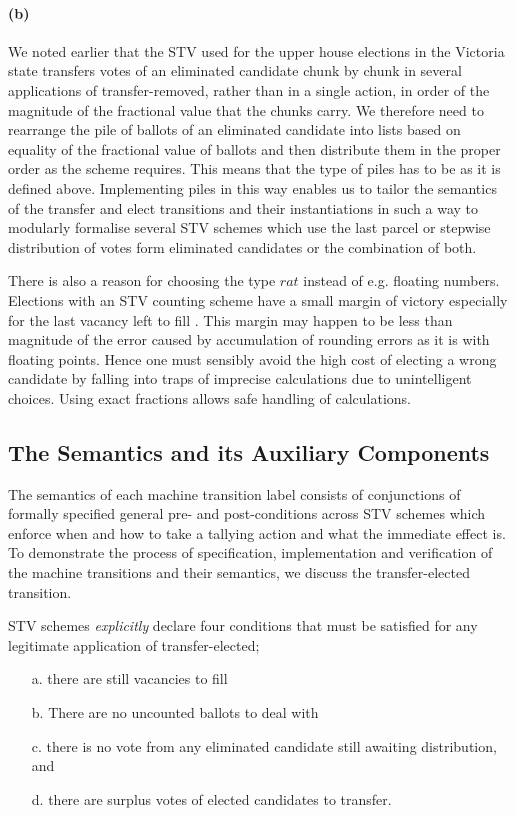 \documentclass[10pt,conference]{IEEEtran}
\begin{document}
\paragraph*{(b)} We noted earlier that the STV used for the upper house elections in the Victoria state transfers votes of an eliminated candidate chunk by chunk in several applications of transfer-removed, rather than in a single action, in order of the magnitude of the fractional value that the chunks carry. We therefore need to rearrange the pile of ballots of an eliminated candidate into lists based on equality of the fractional value of ballots and then distribute them in the proper order as the scheme requires. This means that the type of piles has to be as it is defined above.   
Implementing piles in this way enables us to tailor the semantics of the transfer and elect transitions and their instantiations in such a way to modularly formalise several STV schemes which use the last parcel or stepwise distribution of votes form eliminated candidates or the combination of both. 


There is also a reason for choosing the type $rat$  
instead of e.g. floating numbers. Elections with an STV counting scheme have a small margin of victory especially for the last vacancy left to fill \cite{MBlo}. This margin may happen to be less than magnitude of the error caused by accumulation of rounding errors as it is with floating points.  Hence one must sensibly avoid the high  cost of electing a wrong candidate by falling into traps of imprecise calculations due to unintelligent choices. Using exact fractions allows safe handling of calculations. 
\subsection{The Semantics and its Auxiliary Components}
\label{sec:MachineSem}

The semantics of each machine transition label consists of conjunctions of formally specified general pre- and post-conditions across STV schemes which enforce when and how to take a tallying action and what the immediate effect is. To demonstrate the process of specification, implementation and verification of the machine transitions and their semantics, we discuss the transfer-elected transition.


STV schemes \emph{explicitly} declare four conditions that must be satisfied  for any legitimate application of transfer-elected; 
\begin{itemize}
\item[a.] there are still vacancies to fill
\item[b.] There are no uncounted ballots to deal with
\item[c.] there is no vote from any eliminated candidate still awaiting distribution, and
\item[d.] there are surplus votes of elected candidates to  transfer.
\end{itemize}
\end{document}
